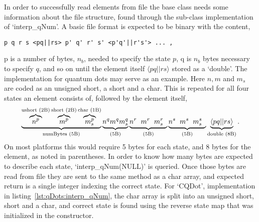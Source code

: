 In order to successfully read elements from file the base class needs some information about the file structure, found through the sub-class implementation of `interp\_qNum'.
A basic file format is expected to be binary with the content,
\begin{verbatim}
p q r s <pq||rs> p' q' r' s' <p'q'||r's'> ... ,
\end{verbatim}
p is a number of bytes, $n_{b}$, needed to specify the state $p$, q is $n_b$ bytes necessary to specify $q$, and so on until the element itself $\langle pq||rs \rangle$ stored as a `double'. 
The implementation for quantum dots may serve as an example.
Here $n,m$ and $m_s$ are coded as an unsigned short, a short and a char. 
This is repeated for all four states an element consists of, followed by the element itself,
\begin{equation}
\underbrace{
\overbrace{n^p}^\text{ushort (2B)} 
\overbrace{m^p}^\text{short (2B)}
\overbrace{m_s^p}^\text{char (1B)}
}_\text{numBytes (5B)}
\underbrace{n^q m^q m_s^q}_\text{(5B)}
\underbrace{n^r\hspace{2mm}m^r\hspace{2mm}m_s^r\hspace{2mm}}_\text{(5B)}
\underbrace{n^s\hspace{2mm}m^s\hspace{2mm}m_s^s\hspace{2mm}}_\text{(5B)}
\underbrace{\langle pq||rs \rangle}_\text{double (8B)} .
\end{equation}
On most platforms this would require 5 bytes for each state, and 8 bytes for the element, as noted in parentheses.
In order to know how many bytes are expected to describe each state, `interp\_qNum(NULL)' is queried.
Once those bytes are read from file they are sent to the same method as a char array, and expected return is a single integer indexing the correct state.
For `CQDot', implementation in listing~\ref{lst:qDots:interp_qNum}, the char array is split into an unsigned short, short and a char, and correct state is found using the reverse state map that was initialized in the constructor.
